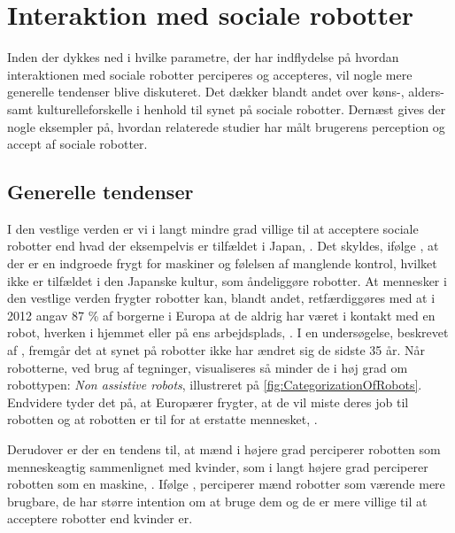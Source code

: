 \section{Interaktion med sociale robotter}
\label{InteraktionSocialeRobotter}
%
Inden der dykkes ned i hvilke parametre, der har indflydelse på hvordan interaktionen med sociale robotter perciperes og accepteres, vil nogle mere generelle tendenser blive diskuteret. Det dækker blandt andet over køns-, alders- samt kulturelleforskelle i henhold til synet på sociale robotter. Dernæst gives der nogle eksempler på, hvordan relaterede studier har målt brugerens perception og accept af sociale robotter.
%
\subsection{Generelle tendenser}
\label{InteraktionSocialeRobotterGenerelleTendenser}
%
I den vestlige verden er vi i langt mindre grad villige til at acceptere sociale robotter end hvad der eksempelvis er tilfældet i Japan, \parencite[s. 28]{PDF:InTheCompanyofRobots}. Det skyldes, ifølge \textcite[s. 28]{PDF:InTheCompanyofRobots}, at der er en indgroede frygt for maskiner og følelsen af manglende kontrol, hvilket ikke er tilfældet i den Japanske kultur, som åndeliggøre robotter. At mennesker i den vestlige verden frygter robotter kan, blandt andet, retfærdiggøres med at i 2012 angav 87 \% af borgerne i Europa at de aldrig har været i kontakt med en robot, hverken i hjemmet eller på ens arbejdsplads, \parencite[s. 40]{PDF:PerceptionAcceptance}. I en undersøgelse, beskrevet af \textcite[s. 41]{PDF:PerceptionAcceptance}, fremgår det at synet på robotter ikke har ændret sig de sidste 35 år. Når robotterne, ved brug af tegninger, visualiseres så minder de i høj grad om robottypen: \textit{Non assistive robots}, illustreret på \autoref{fig:CategorizationOfRobots}. Endvidere tyder det på, at Europærer frygter, at de vil miste deres job til robotten og at robotten er til for at erstatte mennesket, \parencite[s. 22]{PDF:RobotShiftFromIPtoSR}.   

Derudover er der en tendens til, at mænd i højere grad perciperer robotten som menneskeagtig sammenlignet med kvinder, som i langt højere grad perciperer robotten som en maskine, \parencite[s. 28]{PDF:InTheCompanyofRobots}. Ifølge \textcite[s. 1479]{PDF:ExploringInfluencingVariable}, perciperer mænd robotter som værende mere brugbare, de har større intention om at bruge dem og de er mere villige til at acceptere robotter end kvinder er.  

